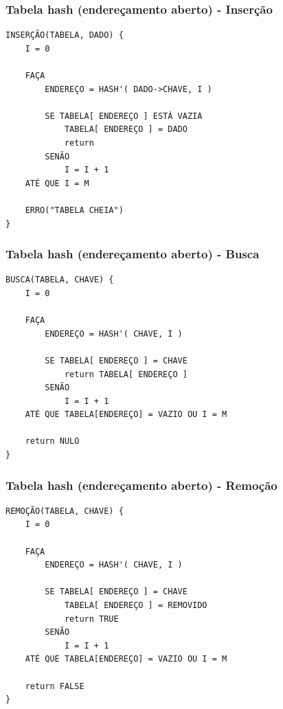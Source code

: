 \begin{frame}[fragile]
\frametitle{Tabela hash (endereçamento aberto) - Inserção}
\begin{verbatim}
INSERÇÃO(TABELA, DADO) {
    I = 0
    
    FAÇA
        ENDEREÇO = HASH'( DADO->CHAVE, I )
        
        SE TABELA[ ENDEREÇO ] ESTÁ VAZIA
            TABELA[ ENDEREÇO ] = DADO
            return
        SENÃO
            I = I + 1
    ATÉ QUE I = M
    
    ERRO("TABELA CHEIA")
}
\end{verbatim}
\end{frame}

\begin{frame}[fragile]
\frametitle{Tabela hash (endereçamento aberto) - Busca}
\begin{verbatim}
BUSCA(TABELA, CHAVE) {
    I = 0
    
    FAÇA
        ENDEREÇO = HASH'( CHAVE, I )
        
        SE TABELA[ ENDEREÇO ] = CHAVE
            return TABELA[ ENDEREÇO ]
        SENÃO
            I = I + 1
    ATÉ QUE TABELA[ENDEREÇO] = VAZIO OU I = M
    
    return NULO
}
\end{verbatim}
\end{frame}

\begin{frame}[fragile]
\frametitle{Tabela hash (endereçamento aberto) - Remoção}
\begin{verbatim}
REMOÇÃO(TABELA, CHAVE) {
    I = 0
    
    FAÇA
        ENDEREÇO = HASH'( CHAVE, I )
        
        SE TABELA[ ENDEREÇO ] = CHAVE
            TABELA[ ENDEREÇO ] = REMOVIDO
            return TRUE
        SENÃO
            I = I + 1
    ATÉ QUE TABELA[ENDEREÇO] = VAZIO OU I = M
    
    return FALSE
}
\end{verbatim}
\end{frame}




